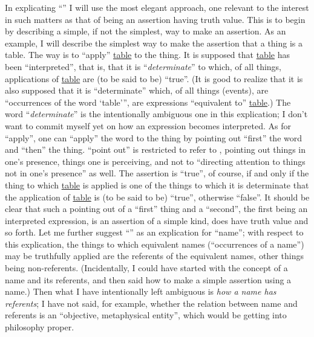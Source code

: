 In explicating \enquote{} I will use the most elegant approach, one 
relevant to the interest in such matters as that of being an assertion having 
truth value. This is to begin by describing a simple, if not the simplest, way 
to make an assertion. As an example, I will describe the simplest way to 
make the assertion that a thing is a table. The way is to \enquote{apply} \uline{table} to 
the thing. It is supposed that \uline{table} has been \enquote{interpreted}, that is, that it is 
\enquote{\emph{determinate}} to which, of all things, applications of \uline{table} are (to be said 
to be) \enquote{true}. (It is good to realize that it is also supposed that it is 
\enquote{determinate} which, of all things (events), are \enquote{occurrences of the word 
\enquote{table}}, are expressions \enquote{equivalent to} \uline{table}.) 
The word \enquote{\emph{determinate}} is 
the intentionally ambiguous one in this explication; I don't want to commit 
myself yet on how an expression becomes interpreted. As for \enquote{apply}, one 
can \enquote{apply} the word to the thing by pointing out \enquote{first} the word and 
\enquote{then} the thing. \enquote{point out} is restricted to refer to , pointing 
out things in one's presence, things one is perceiving, and not to \enquote{directing 
attention to things not in one's presence} as well. The assertion is \enquote{true}, of 
course, if and only if the thing to which \uline{table} is applied is one of the things 
to which it is determinate that the application of \uline{table} is (to be said to be) 
\enquote{true}, otherwise \enquote{false}. It should be clear that such a pointing out of a 
\enquote{first} thing and a \enquote{second}, the first being an interpreted expression, is an 
assertion of a simple kind, does have truth value and so forth. Let me further 
suggest \enquote{} as an explication for \enquote{name}; with respect to 
this explication, the things to which equivalent names (\enquote{occurrences of a 
name}) may be truthfully applied are the referents of the equivalent names, 
other things being non-referents. (Incidentally, I could have started with the 
concept of a name and its referents, and then said how to make a simple 
assertion using a name.) Then what I have intentionally left ambiguous is 
\emph{how a name has referents}; I have not said, for example, whether the relation 
between name and referents is an \enquote{objective, metaphysical entity}, which 
would be getting into philosophy proper. 

